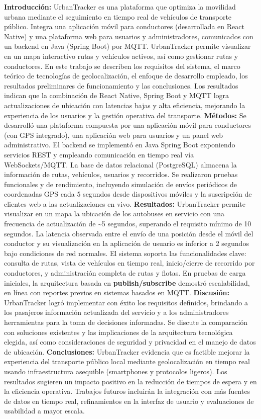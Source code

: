\textbf{Introducción:} UrbanTracker es una plataforma que optimiza la movilidad urbana mediante el seguimiento en tiempo real de vehículos de transporte público. Integra una aplicación móvil para conductores (desarrollada en React Native) y una plataforma web para usuarios y administradores, comunicados con un backend en Java (Spring Boot) por MQTT. UrbanTracker permite visualizar en un mapa interactivo rutas y vehículos activos, así como gestionar rutas y conductores. En este trabajo se describen los requisitos del sistema, el marco teórico de tecnologías de geolocalización, el enfoque de desarrollo empleado, los resultados preliminares de funcionamiento y las conclusiones. Los resultados indican que la combinación de React Native, Spring Boot y MQTT logra actualizaciones de ubicación con latencias bajas y alta eficiencia, mejorando la experiencia de los usuarios y la gestión operativa del transporte. 
\textbf{Métodos:} Se desarrolló una plataforma compuesta por una aplicación móvil para conductores (con GPS integrado), una aplicación web para usuarios y un panel web administrativo. El backend se implementó en Java Spring Boot exponiendo servicios REST y empleando comunicación en tiempo real vía WebSockets/MQTT. La base de datos relacional (PostgreSQL) almacena la información de rutas, vehículos, usuarios y recorridos. Se realizaron pruebas funcionales y de rendimiento, incluyendo simulación de envíos periódicos de coordenadas GPS cada 5 segundos desde dispositivos móviles y la suscripción de clientes web a las actualizaciones en vivo. 
\textbf{Resultados:} UrbanTracker permite visualizar en un mapa la ubicación de los autobuses en servicio con una frecuencia de actualización de \textasciitilde5 segundos, superando el requisito mínimo de 10 segundos. La latencia observada entre el envío de una posición desde el móvil del conductor y su visualización en la aplicación de usuario es inferior a 2 segundos bajo condiciones de red normales. El sistema soporta las funcionalidades clave: consulta de rutas, vista de vehículos en tiempo real, inicio/cierre de recorrido por conductores, y administración completa de rutas y flotas. En pruebas de carga iniciales, la arquitectura basada en 
\textbf{publish/subscribe} demostró escalabilidad, en línea con reportes previos en sistemas basados en MQTT\cite{ortiz2022smolcomm}. 
\textbf{Discusión:} UrbanTracker logró implementar con éxito los requisitos definidos, brindando a los pasajeros información actualizada del servicio y a los administradores herramientas para la toma de decisiones informadas. Se discute la comparación con soluciones existentes y las implicaciones de la arquitectura tecnológica elegida, así como consideraciones de seguridad y privacidad en el manejo de datos de ubicación. 
\textbf{Conclusiones:} UrbanTracker evidencia que es factible mejorar la experiencia del transporte público local mediante geolocalización en tiempo real usando infraestructura asequible (smartphones y protocolos ligeros). Los resultados sugieren un impacto positivo en la reducción de tiempos de espera y en la eficiencia operativa. Trabajos futuros incluirán la integración con más fuentes de datos en tiempo real, refinamientos en la interfaz de usuario y evaluaciones de usabilidad a mayor escala.
